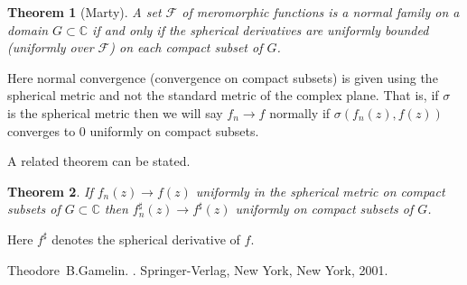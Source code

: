\documentclass[12pt]{article}
\theoremstyle{theorem}
\newtheorem*{thm}{Theorem}
\theoremstyle{definition}
\begin{document}
\begin{thm}[Marty]
A set ${\mathcal{F}}$ of meromorphic functions is a normal family
on a domain $G \subset {\mathbb{C}}$ if and only if the spherical
derivatives are uniformly bounded (uniformly over ${\mathcal{F}}$)
on each compact subset of $G$.
\end{thm}

Here normal convergence (convergence on compact subsets) is given using the
spherical metric and not the standard metric of the complex plane.  That is, if
$\sigma$ is the spherical metric then we will say $f_n \to f$ normally
if $\sigma(f_n(z),f(z))$ converges to 0 uniformly on compact subsets.

A related theorem can be stated.

\begin{thm}
If $f_n(z) \to f(z)$ uniformly in the spherical metric on compact subsets of
$G \subset {\mathbb{C}}$ then $f_n^\sharp(z) \to f^\sharp(z)$ uniformly
on compact subsets of $G$.
\end{thm}

Here $f^\sharp$ denotes the spherical derivative of $f$.

\begin{thebibliography}{9}
Theodore~B.\@ Gamelin.
{\em {}}.
Springer-Verlag, New York, New York, 2001.
\end{thebibliography}
\end{document}
